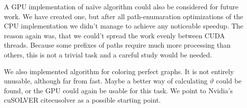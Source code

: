 A GPU implementation of na\"ive algorithm could also be considered for future work. We have created one, but after all path-enumaration optimizations of the CPU implementation we didn't manage to achieve any noticeable speedup. The reason again was, that we could't spread the work evenly between CUDA threads. Because some prefixes of paths require much more processing than others, this is not a trivial task and a careful study would be needed.

We also implemented algorithm for coloring perfect graphs. It is not entirely unusable, although far from fast. Maybe a better way of calculating $\vartheta$ could be found, or the GPU could again be usable for this task. We point to Nvidia's cuSOLVER  cite{cusolver} as a possible starting point.